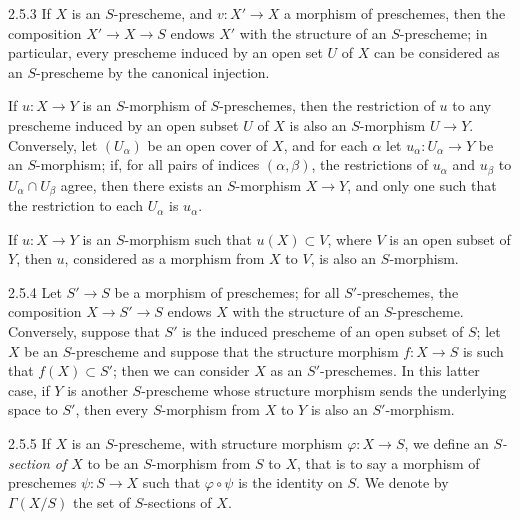 \documentclass[../main.tex]{subfiles}
\begin{document}
\begin{cx}{2.5.3}
    If $X$ is an $S$-prescheme, and $v\colon X'\to X$ a morphism of preschemes, then the composition $X'\to X\to S$ endows $X'$ with the structure of an $S$-prescheme; in particular, every prescheme induced by an open set $U$ of $X$ can be considered as an $S$-prescheme by the canonical injection.
\end{cx}

If $u\colon X\to Y$ is an $S$-morphism of $S$-preschemes, then the restriction of $u$ to any prescheme induced by an open subset $U$ of $X$ is also an $S$-morphism $U\to Y$.
Conversely, let $(U_\alpha)$ be an open cover of $X$, and for each $\alpha$ let $u_\alpha\colon U_\alpha\to Y$ be an $S$-morphism; if, for all pairs of indices $(\alpha,\beta)$, the restrictions of $u_\alpha$ and $u_\beta$ to $U_\alpha\cap U_\beta$ agree, then there exists an $S$-morphism $X\to Y$, and only one such that the restriction to each $U_\alpha$ is $u_\alpha$.

If $u\colon X\to Y$ is an $S$-morphism such that $u(X)\subset V$, where $V$ is an open subset of $Y$, then $u$, considered as a morphism from $X$ to $V$, is also an $S$-morphism.

\begin{cx}{2.5.4}
    Let $S'\to S$ be a morphism of preschemes; for all $S'$-preschemes, the composition $X\to S'\to S$ endows $X$ with the structure of an $S$-prescheme.
    Conversely, suppose that $S'$ is the induced prescheme of an open subset of $S$; let $X$ be an $S$-prescheme and suppose that the structure morphism $f\colon X\to S$ is such that $f(X)\subset S'$; then we can consider $X$ as an $S'$-preschemes.
    In this latter case, if $Y$ is another $S$-prescheme whose structure morphism sends the underlying space to $S'$, then every $S$-morphism from $X$ to $Y$ is also an $S'$-morphism.
\end{cx}

\begin{cx}{2.5.5}
    If $X$ is an $S$-prescheme, with structure morphism $\varphi\colon X\to S$, we define an \emph{$S$-section of $X$} to be an $S$-morphism from $S$ to $X$, that is to say a morphism of preschemes $\psi\colon S\to X$ such that $\varphi\circ\psi$ is the identity on $S$.
    We denote by $\Gamma(X/S)$ the set of $S$-sections of $X$.
\end{cx}
\end{document}

